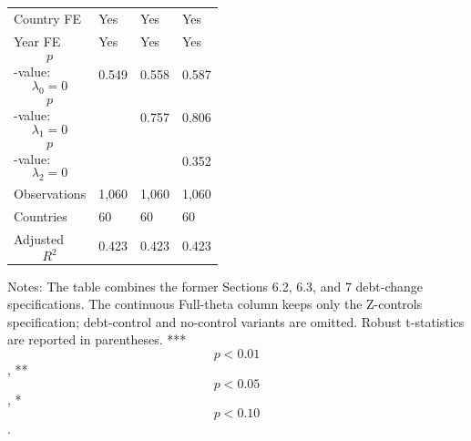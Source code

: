 \begin{table}[H]
\begin{threeparttable}
\begin{tabularx}{\textwidth}{lYYY}
Country FE & Yes & Yes & Yes \\
Year FE & Yes & Yes & Yes \\
$$p$$-value: $$\lambda_0=0$$ & 0.549 & 0.558 & 0.587 \\
$$p$$-value: $$\lambda_1=0$$ &  & 0.757 & 0.806 \\
$$p$$-value: $$\lambda_2=0$$ &  &  & 0.352 \\
Observations & 1,060 & 1,060 & 1,060 \\
Countries & 60 & 60 & 60 \\
Adjusted $$R^2$$ & 0.423 & 0.423 & 0.423 \\
\bottomrule
\end{tabularx}
\begin{tablenotes}[flushleft]\footnotesize
\item Notes: The table combines the former Sections 6.2, 6.3, and 7 debt-change specifications. The continuous Full-theta column keeps only the Z-controls specification; debt-control and no-control variants are omitted. Robust t-statistics are reported in parentheses. *** $$p<0.01$$, ** $$p<0.05$$, * $$p<0.10$$.
\end{tablenotes}
\end{threeparttable}
\end{table}
